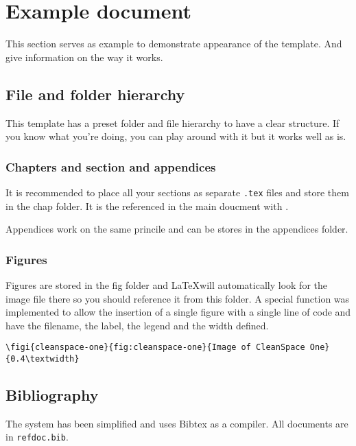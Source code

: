 \section{Example document}

    This section serves as example to demonstrate appearance of the template. And give information on the way it works.

    \subsection{File and folder hierarchy}

        This template has a preset folder and file hierarchy to have a clear structure. If you know what you're doing, you can play around with it but it works well as is.

        \subsubsection{Chapters and section and appendices}

            It is recommended to place all your sections as separate \texttt{.tex} files and store them in the chap folder. It is the referenced in the main doucment with \verb''.

            Appendices work on the same princile and can be stores in the appendices folder.

        \subsubsection{Figures}

            Figures are stored in the fig folder and \LaTeX will automatically look for the image file there so you should reference it from this folder. A special function was implemented to allow the insertion of a single figure with a single line of code and have the filename, the label, the legend and the width defined.

            {\scriptsize\verb'\figi{cleanspace-one}{fig:cleanspace-one}{Image of CleanSpace One}{0.4\textwidth}'}



    \subsection{Bibliography}

        The system has been simplified and uses Bibtex as a compiler. All documents are in \texttt{refdoc.bib}.



